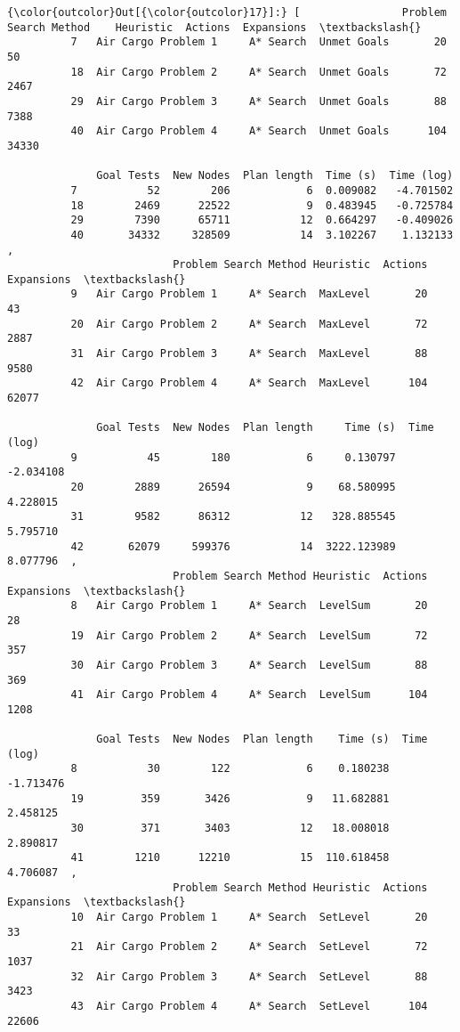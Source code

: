 \documentclass[11pt]{article}
\begin{document}
\begin{Verbatim}[commandchars=\\\{\}]
{\color{outcolor}Out[{\color{outcolor}17}]:} [                Problem Search Method    Heuristic  Actions  Expansions  \textbackslash{}
          7   Air Cargo Problem 1     A* Search  Unmet Goals       20          50   
          18  Air Cargo Problem 2     A* Search  Unmet Goals       72        2467   
          29  Air Cargo Problem 3     A* Search  Unmet Goals       88        7388   
          40  Air Cargo Problem 4     A* Search  Unmet Goals      104       34330   
          
              Goal Tests  New Nodes  Plan length  Time (s)  Time (log)  
          7           52        206            6  0.009082   -4.701502  
          18        2469      22522            9  0.483945   -0.725784  
          29        7390      65711           12  0.664297   -0.409026  
          40       34332     328509           14  3.102267    1.132133  ,
                          Problem Search Method Heuristic  Actions  Expansions  \textbackslash{}
          9   Air Cargo Problem 1     A* Search  MaxLevel       20          43   
          20  Air Cargo Problem 2     A* Search  MaxLevel       72        2887   
          31  Air Cargo Problem 3     A* Search  MaxLevel       88        9580   
          42  Air Cargo Problem 4     A* Search  MaxLevel      104       62077   
          
              Goal Tests  New Nodes  Plan length     Time (s)  Time (log)  
          9           45        180            6     0.130797   -2.034108  
          20        2889      26594            9    68.580995    4.228015  
          31        9582      86312           12   328.885545    5.795710  
          42       62079     599376           14  3222.123989    8.077796  ,
                          Problem Search Method Heuristic  Actions  Expansions  \textbackslash{}
          8   Air Cargo Problem 1     A* Search  LevelSum       20          28   
          19  Air Cargo Problem 2     A* Search  LevelSum       72         357   
          30  Air Cargo Problem 3     A* Search  LevelSum       88         369   
          41  Air Cargo Problem 4     A* Search  LevelSum      104        1208   
          
              Goal Tests  New Nodes  Plan length    Time (s)  Time (log)  
          8           30        122            6    0.180238   -1.713476  
          19         359       3426            9   11.682881    2.458125  
          30         371       3403           12   18.008018    2.890817  
          41        1210      12210           15  110.618458    4.706087  ,
                          Problem Search Method Heuristic  Actions  Expansions  \textbackslash{}
          10  Air Cargo Problem 1     A* Search  SetLevel       20          33   
          21  Air Cargo Problem 2     A* Search  SetLevel       72        1037   
          32  Air Cargo Problem 3     A* Search  SetLevel       88        3423   
          43  Air Cargo Problem 4     A* Search  SetLevel      104       22606   
          

\end{Verbatim}
\end{document}
